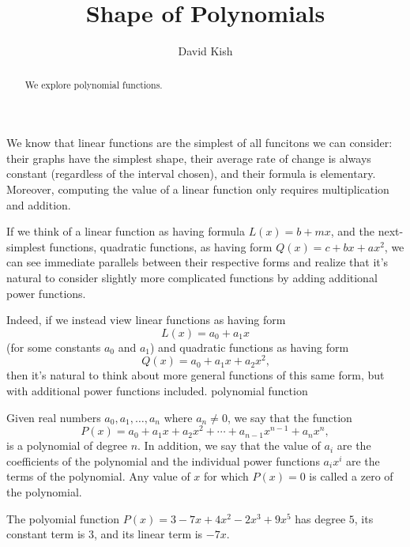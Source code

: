 \documentclass{ximera}
\author{David Kish}
\title{Shape of Polynomials}
\begin{document}
\begin{abstract}
We explore polynomial functions.
\end{abstract}
\maketitle

We know that linear functions are the simplest of all funcitons we can consider:  their graphs have the simplest shape, their average rate of change is always constant (regardless of the interval chosen), and their formula is elementary.  Moreover, computing the value of a linear function only requires multiplication and addition.%

If we think of a linear function as having formula $L(x) = b + mx$, and the next-simplest functions, quadratic functions, as having form $Q(x) = c + bx + ax^2$, we can see immediate parallels between their respective forms and realize that it's natural to consider slightly more complicated functions by adding additional power functions.%

Indeed, if we instead view linear functions as having form
$$
L(x) = a_0 + a_1 x
$$
(for some constants $a_0$ and $a_1$) and quadratic functions as having form%
$$
Q(x) = a_0 + a_1 x + a_2 x^2\text{,}
$$
then it's natural to think about more general functions of this same form, but with additional power functions included.%
polynomial function

Given real numbers $a_0, a_1, \ldots, a_n$ where $a_n \ne 0$, we say that the function%
$$
P(x) = a_0 + a_1 x + a_2 x^2 + \cdots + a_{n-1}x^{n-1} + a_n x^n, 
$$
is a polynomial of degree $n$.  In addition, we say that the value of $a_i$ are the coefficients of the polynomial and the individual power functions $a_i x^i$ are the terms of the polynomial.   Any value of $x$ for which $P(x) = 0$ is called a zero of the polynomial. 

\begin{example}%

The polyomial function $P(x) = 3 - 7x + 4x^2 - 2x^3 + 9x^5$ has degree $5$, its constant term is $3$, and its linear term is $-7x$.%
\end{example}
\end{document}
